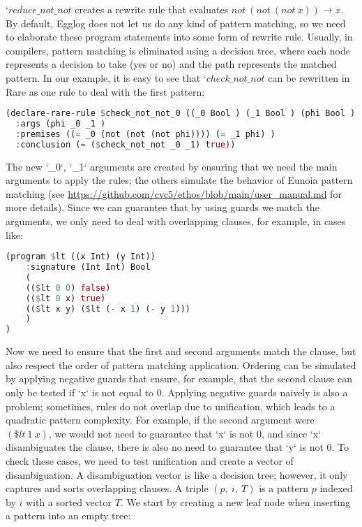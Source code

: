 \documentclass{article}
\begin{document}
`$reduce\_not\_not$ creates a rewrite rule that evaluates $not\:(not\:(not\:x)) \rightarrow x$. By default, Egglog does not let us do any kind of pattern matching, so we need to elaborate these program statements into some form of rewrite rule. Usually, in compilers, pattern matching is eliminated using a decision tree, where each node represents a decision to take (yes or no) and the path represents the matched pattern. In our example, it is easy to see that `$check\_not\_not$ can be rewritten in Rare as one rule to deal with the first pattern:

\begin{lstlisting}[language=Rust]
(declare-rare-rule $check_not_not_0 ((_0 Bool ) (_1 Bool ) (phi Bool ) )
  :args (phi _0 _1 )
  :premises ((= _0 (not (not (not phi)))) (= _1 phi) )
  :conclusion (= ($check_not_not _0 _1) true))
\end{lstlisting}

The new `\_0`, `\_1` arguments are created by ensuring that we need the main arguments to apply the rules; the others simulate the behavior of Eunoia pattern matching (see \url{https://github.com/cvc5/ethos/blob/main/user_manual.md} for more details). Since we can guarantee that by using guards we match the arguments, we only need to deal with overlapping clauses, for example, in cases like:

\begin{lstlisting}[language=Rust]
(program $lt ((x Int) (y Int))
    :signature (Int Int) Bool
    (
    (($lt 0 0) false)
    (($lt 0 x) true)
    (($lt x y) ($lt (- x 1) (- y 1)))
    )
)
\end{lstlisting}

Now we need to ensure that the first and second arguments match the clause, but also respect the order of pattern matching application. Ordering can be simulated by applying negative guards that ensure, for example, that the second clause can only be tested if `x` is not equal to 0. Applying negative guards naively is also a problem; sometimes, rules do not overlap due to unification, which leads to a quadratic pattern complexity. For example, if the second argument were $(\$lt\:1\:x)$, we would not need to guarantee that `x` is not 0, and since `x` disambiguates the clause, there is also no need to guarantee that `y` is not 0. To check these cases, we need to test unification and create a vector of disambiguation. A disambiguation vector is like a decision tree; however, it only captures and sorts overlapping clauses. A triple $(p,\:i,\:T)$ is a pattern $p$ indexed by $i$ with a sorted vector $T$. We start by creating a new leaf node when inserting a pattern into an empty tree:
\end{document}
